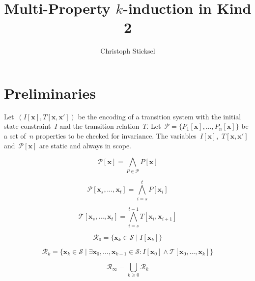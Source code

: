 \documentclass[12pt]{article}
\renewcommand{\textproc}{\textsl}
\renewcommand{\vec}[1]{\mathbf{#1}}            %
\newcommand{\sspace}{\ensuremath{\mathcal{S}}}
\newcommand{\init}{\ensuremath{I}}
\newcommand{\transt}{\ensuremath{\mathcal{T}}}
\newcommand{\reachablek}[1]{\ensuremath{\mathcal{R}_{#1}}}
\newcommand{\reachable}{\ensuremath{\mathcal{R}_\infty}}
\begin{document}
\title{Multi-Property $k$-induction in Kind 2}

\author{Christoph Sticksel}
\maketitle

\section{Preliminaries}
\label{sec:prelim}


Let~${(I[\vec x], T[\vec x, \vec x'])}$ be the encoding of a transition system with the initial state constraint~$I$ and the transition relation~$T$. Let~${\mathcal{P} = \{ P_1[\vec x], \dotsc, P_n[\vec x] \}}$ be a set of~$n$ properties to be checked for invariance. The variables~$I[\vec x]$,~$T[\vec x, \vec x']$ and~$\mathcal{P}[\vec x]$ are static and always in scope.

\[ \mathcal{P}[\vec x] = \bigwedge_{P\in\mathcal{P}} P[\vec x] \]

\[ \mathcal{P}[\vec x_s,\dotsc,\vec x_t] = \bigwedge_{i=s}^t P[\vec x_i] \]

\[ \mathcal{T}[\vec x_s,\dotsc,\vec x_t] = \bigwedge_{i=s}^{t-1}  T[\vec x_i,\vec x_{i+1}]  \]

\[ \reachablek{0} = \{ \vec x_k \in \sspace \mid \init[\vec x_k] \} \]

\[ \reachablek{k} = \{ \vec x_k \in \sspace \mid \exists \vec x_0,\dotsc,\vec x_{k-1} \in \sspace \colon \init[\vec x_0] \land \transt[\vec x_0,\dotsc,\vec x_k] \} \]

\[ \reachable = \bigcup_{k \geq 0} \reachablek{k} \]






\end{document}
